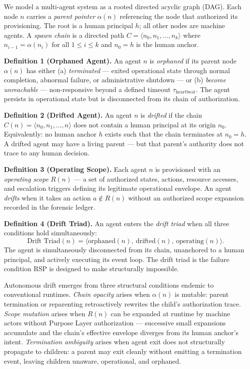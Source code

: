 We model a multi-agent system as a rooted directed acyclic graph (DAG). Each node $n$ carries a \emph{parent pointer} $\alpha(n)$ referencing the node that authorized its provisioning. The root is a human principal $h$; all other nodes are machine agents. A \emph{spawn chain} is a directed path $C = \langle n_0, n_1, \ldots, n_k \rangle$ where $n_{i-1} = \alpha(n_i)$ for all $1 \leq i \leq k$ and $n_0 = h$ is the human anchor.

\medskip
\noindent\textbf{Definition 1 (Orphaned Agent).} An agent $n$ is \emph{orphaned} if its parent node $\alpha(n)$ has either (a) \emph{terminated} — exited operational state through normal completion, abnormal failure, or administrative shutdown — or (b) \emph{become unreachable} — non-responsive beyond a defined timeout $\tau_{\mathrm{heartbeat}}$. The agent persists in operational state but is disconnected from its chain of authorization.

\medskip
\noindent\textbf{Definition 2 (Drifted Agent).} An agent $n$ is \emph{drifted} if the chain $C(n) = \langle n_0, n_1, \ldots, n \rangle$ does not contain a human principal at its origin $n_0$. Equivalently: no human anchor $h$ exists such that the chain terminates at $n_0 = h$. A drifted agent may have a living parent — but that parent's authority does not trace to any human decision.

\medskip
\noindent\textbf{Definition 3 (Operating Scope).} Each agent $n$ is provisioned with an \emph{operating scope} $R(n)$ — a set of authorized states, actions, resource accesses, and escalation triggers defining its legitimate operational envelope. An agent \emph{drifts} when it takes an action $a \notin R(n)$ without an authorized scope expansion recorded in the forensic ledger.

\medskip
\noindent\textbf{Definition 4 (Drift Triad).} An agent enters the \emph{drift triad} when all three conditions hold simultaneously:
\begin{equation}
\text{Drift Triad}(n) = \bigl\langle \text{orphaned}(n),\ \text{drifted}(n),\ \text{operating}(n) \bigr\rangle .
\label{eq:intro-drift-triad}
\end{equation}
The agent is simultaneously disconnected from its chain, unanchored to a human principal, and actively executing its event loop. The drift triad is the failure condition RSP is designed to make structurally impossible.

Autonomous drift emerges from three structural conditions endemic to conventional runtimes. \emph{Chain opacity} arises when $\alpha(n)$ is mutable: parent termination or reparenting retroactively rewrites the child's authorization trace. \emph{Scope mutation} arises when $R(n)$ can be expanded at runtime by machine actors without Purpose Layer authorization — successive small expansions accumulate and the chain's effective envelope diverges from its human anchor's intent. \emph{Termination ambiguity} arises when agent exit does not structurally propagate to children: a parent may exit cleanly without emitting a termination event, leaving children unaware, operational, and orphaned.

